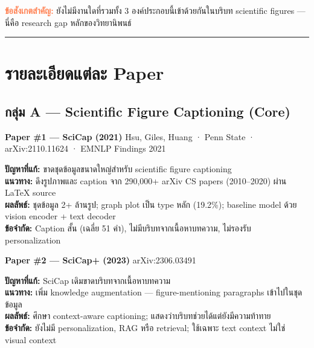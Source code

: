 \documentclass[10pt,a4paper]{article}
\begin{document}
\vspace{8pt}
\noindent\textcolor{coral}{\textbf{ข้อสังเกตสำคัญ:}} ยังไม่มีงานใดที่รวมทั้ง 3 องค์ประกอบนี้เข้าด้วยกันในบริบท scientific figures — นี่คือ research gap หลักของวิทยานิพนธ์

\noindent\rule{\linewidth}{0.5pt}

\section{รายละเอียดแต่ละ Paper}

\subsection*{\textcolor{accent-teal}{กลุ่ม A — Scientific Figure Captioning (Core)}}

\textbf{Paper \#1 — SciCap (2021)}
\hfill {\color{muted}\small Hsu, Giles, Huang · Penn State · arXiv:2110.11624 · EMNLP Findings 2021}

\begin{infobox}
\textbf{ปัญหาที่แก้:} ขาดชุดข้อมูลขนาดใหญ่สำหรับ scientific figure captioning\\
\textbf{แนวทาง:} ดึงรูปภาพและ caption จาก 290,000+ arXiv CS papers (2010–2020) ผ่าน LaTeX source\\
\textbf{ผลลัพธ์:} ชุดข้อมูล 2+ ล้านรูป; graph plot เป็น type หลัก (19.2\%); baseline model ด้วย vision encoder + text decoder\\
\textbf{ข้อจำกัด:} Caption สั้น (เฉลี่ย 51 คำ), ไม่มีบริบทจากเนื้อหาบทความ, ไม่รองรับ personalization
\end{infobox}

\vspace{6pt}
\textbf{Paper \#2 — SciCap+ (2023)}
\hfill {\color{muted}\small arXiv:2306.03491}

\begin{infobox}
\textbf{ปัญหาที่แก้:} SciCap เดิมขาดบริบทจากเนื้อหาบทความ\\
\textbf{แนวทาง:} เพิ่ม knowledge augmentation — figure-mentioning paragraphs เข้าไปในชุดข้อมูล\\
\textbf{ผลลัพธ์:} ศึกษา context-aware captioning; แสดงว่าบริบทช่วยได้แต่ยังมีความท้าทาย\\
\textbf{ข้อจำกัด:} ยังไม่มี personalization, RAG หรือ retrieval; ใช้เฉพาะ text context ไม่ใช่ visual context
\end{infobox}
\end{document}

